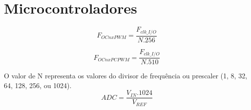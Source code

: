 \part*{Microcontroladores} \label{mcu}
	\begin{equation}
\boxed{F_{OCnxPWM}=\frac{F_{clk\_I/O}}{N.256}}
	\end{equation} \par
	\begin{equation}
\boxed{F_{OCnxPCPWM}=\frac{F_{clk\_I/O}}{N.510}}
	\end{equation} \par
O valor de N representa os valores do divisor de frequ\^{e}ncia ou prescaler (1, 8, 32, 64, 128, 256, ou 1024).
	\begin{equation}
\boxed{ADC=\frac{V_{IN}.1024}{V_{REF}}}
	\end{equation} \par

